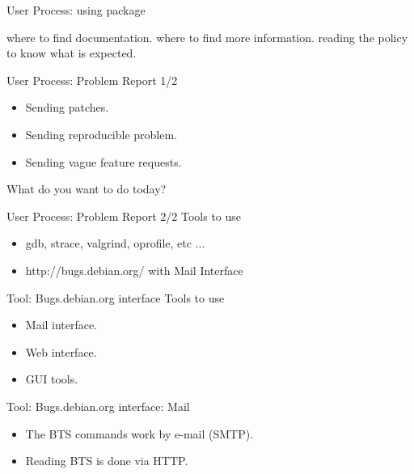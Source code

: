 \documentclass[cjk,dvipdfm,12pt]{beamer}
\begin{document}
\begin{frame}{User Process: using package}

where to find documentation.
where to find more information.
reading the policy to know what is expected.

\end{frame}

\begin{frame}{User Process: Problem Report 1/2}
\begin{itemize}
 \item Sending patches.
 \item Sending reproducible problem.
 \item Sending vague feature requests.
\end{itemize}

What do you want to do today?
\end{frame}

\begin{frame}{User Process: Problem Report 2/2}
Tools to use 
\begin{itemize}
 \item gdb, strace, valgrind, oprofile, etc ... 
 \item http://bugs.debian.org/ with Mail Interface
\end{itemize} 
\end{frame}

\begin{frame}{Tool: Bugs.debian.org interface}
Tools to use 
\begin{itemize}
 \item Mail interface.
 \item Web interface.
 \item GUI tools.
\end{itemize} 
\end{frame}

\begin{frame}[containsverbatim]{Tool: Bugs.debian.org interface: Mail}
\begin{minipage}{0.49\hsize}
\begin{itemize}
 \item The BTS commands work by e-mail (SMTP).
 \item Reading BTS is done via HTTP.
\end{itemize}
\end{minipage}
\begin{minipage}{0.49\hsize}
\end{minipage}
\end{frame}
\end{document}
